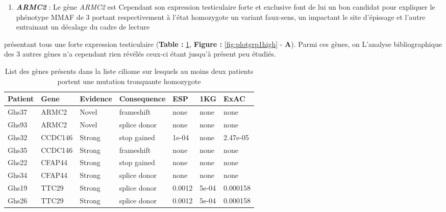 \documentclass[12pt,twoside]{reedthesis}
\providecommand{\tightlist}{%
  \setlength{\itemsep}{0pt}\setlength{\parskip}{0pt}}
\theoremstyle{definition}
\theoremstyle{definition}
\theoremstyle{remark}
\begin{document}
  \begin{enumerate}
  \def\labelenumi{\arabic{enumi}.}
  \tightlist
  \item
    \textbf{\emph{ARMC2}} : Le gène \emph{ARMC2} est Cependant son
    expression testiculaire forte et exclusive font de lui un bon candidat
    pour expliquer le phénotype MMAF de 3 portant respectivement à l'état
    homozygote un variant faux-sens, un impactant le site d'épissage et
    l'autre entrainant un décalage du cadre de lecture
  \end{enumerate}
  
  présentant tous une forte expression testiculaire (\textbf{Table :
  }\ref{tab:tabgrp1high}, \textbf{Figure : }\ref{fig:plotgrp1high} -
  \textbf{A}). Parmi ces gènes, on L'analyse bibliographique des 3 autres
  gènes n'a cependant rien révélés ceux-ci étant jusqu'à présent peu
  étudiés.
  
  \newpage
  
  \newpage
  
  \begin{longtable}[t]{lllllll}
  \caption{\label{tab:tabgrp1high}List des gènes présents dans la liste ciliome sur lesquels au moins deux patients portent une mutation tronquante homozygote}\\
  \toprule
  Patient & Gene & Evidence & Consequence & ESP & 1KG & ExAC\\
  \midrule
  Ghs37 & ARMC2 & Novel & frameshift & none & none & none\\
  Ghs93 & ARMC2 & Novel & splice donor & none & none & none\\
  Ghs32 & CCDC146 & Strong & stop gained & 1e-04 & none & 2.47e-05\\
  Ghs35 & CCDC146 & Strong & frameshift & none & none & none\\
  Ghs22 & CFAP44 & Strong & stop gained & none & none & none\\
  \addlinespace
  Ghs34 & CFAP44 & Strong & splice donor & none & none & none\\
  Ghs19 & TTC29 & Strong & splice donor & 0.0012 & 5e-04 & 0.000158\\
  Ghs26 & TTC29 & Strong & splice donor & 0.0012 & 5e-04 & 0.000158\\
  \bottomrule
  \end{longtable}
  
\end{document}
